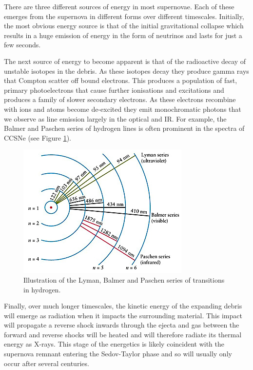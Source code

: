 There are three different sources of energy in most supernovae.  Each of these emerges from the supernova in different forms over different timescales.  Initially, the most obvious energy source is that of the initial gravitational collapse which results in a huge emission of energy in the form of neutrinos and lasts for just a few seconds.  

The next source of energy to become apparent is that of the radioactive decay of unstable isotopes in the debris.  As these isotopes decay they produce gamma rays that Compton scatter off bound electrons.  This produces a population of fast, primary photoelectrons that cause further ionisations and excitations and produces a family of slower secondary electrons.  As these electrons recombine with ions and atoms become de-excited they emit monochromatic photons that we observe as line emission largely in the optical and IR.  For example, the Balmer and Paschen series of hydrogen lines is often prominent in the spectra of CCSNe (see Figure \ref{fig:balmer}).

 \begin{figure}
\centering
\includegraphics[clip=true,scale=0.9,trim= 0 0 0 0]{chapters/chapter1/figs/balmer1.jpg}
\caption{Illustration of the Lyman, Balmer and Paschen series of transitions in hydrogen.}
\label{fig:balmer}
\end{figure}


Finally, over much longer timescales, the kinetic energy of the expanding debris will emerge as radiation when it impacts the surrounding material.  This impact will propagate a reverse shock inwards through the ejecta and gas between the forward and reverse shocks will be heated and will therefore radiate its thermal energy as X-rays.  This stage of the energetics is likely coincident with the supernova remnant entering the Sedov-Taylor phase and so will usually only occur after several centuries.  

